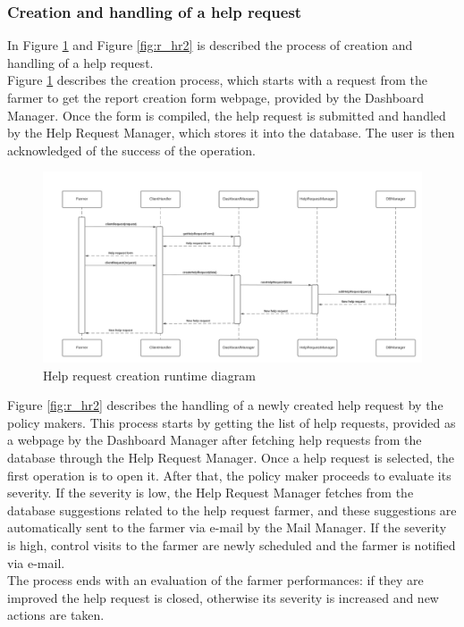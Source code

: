 \documentclass[10pt]{article} %
\begin{document}
\subsubsection{Creation and handling of a help request}
In Figure \ref{fig:r_hr1} and Figure \ref{fig:r_hr2} is described the process of creation and handling of a help request.\\
Figure \ref{fig:r_hr1} describes the creation process, which starts with a request from the farmer to get the report creation form webpage, provided by the Dashboard Manager.
Once the form is compiled, the help request is submitted and handled by the Help Request Manager, which stores it into the database. The user is then acknowledged of the success
of the operation.\\
\begin{figure}[h!]
    \centering
    \centerline{\includegraphics[scale=0.45]{images/rv/helpRequestCreation.png}}
    \caption{Help request creation runtime diagram}
    \label{fig:r_hr1}
\end{figure}
Figure \ref{fig:r_hr2} describes the handling of a newly created help request by the policy makers. This process starts by getting the list of help requests, provided as a webpage
by the Dashboard Manager after fetching help requests from the database through the Help Request Manager.
Once a help request is selected, the first operation is to open it. After that, the policy maker proceeds to evaluate its severity. If the severity is low, the Help Request Manager
fetches from the database suggestions related to the help request farmer, and these suggestions are automatically sent to the farmer via e-mail by the Mail Manager.
If the severity is high, control visits to the farmer are newly scheduled and the farmer is notified via e-mail.\\
The process ends with an evaluation of the farmer performances: if they are improved the help request is closed, otherwise its severity is increased and new actions are taken.
\end{document}
